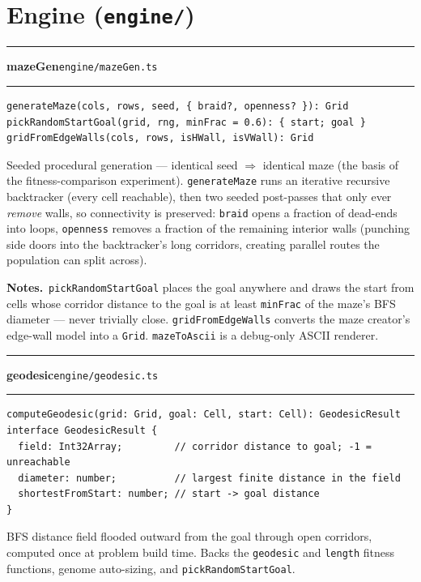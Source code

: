 \documentclass[11pt,a4paper]{report}
\newcommand{\srcfile}[1]{\texttt{\small #1}}   %
\newcommand{\ts}[1]{\texttt{#1}}               %
\newenvironment{apientry}[2]{%
  \par\medskip\noindent
  \begin{minipage}{\textwidth}
  \hrule\vspace{0.6ex}
  {\large\ttfamily\bfseries #1}\hfill{\footnotesize\srcfile{#2}}
  \vspace{0.4ex}\hrule\medskip
}{%
  \end{minipage}\par\medskip
}
\newcommand{\apifield}[1]{\par\smallskip\noindent\textbf{#1.}\ }
\begin{document}
\section{Engine (\srcfile{engine/})}

\begin{apientry}{mazeGen}{engine/mazeGen.ts}
\begin{lstlisting}
generateMaze(cols, rows, seed, { braid?, openness? }): Grid
pickRandomStartGoal(grid, rng, minFrac = 0.6): { start; goal }
gridFromEdgeWalls(cols, rows, isHWall, isVWall): Grid
\end{lstlisting}
Seeded procedural generation --- identical seed $\Rightarrow$ identical
maze (the basis of the fitness-comparison experiment). \ts{generateMaze}
runs an iterative recursive backtracker (every cell reachable), then two
seeded post-passes that only ever \emph{remove} walls, so connectivity is
preserved: \ts{braid} opens a fraction of dead-ends into loops,
\ts{openness} removes a fraction of the remaining interior walls
(punching side doors into the backtracker's long corridors, creating
parallel routes the population can split across).
\apifield{Notes}\ts{pickRandomStartGoal} places the goal anywhere and
draws the start from cells whose corridor distance to the goal is at
least \ts{minFrac} of the maze's BFS diameter --- never trivially close.
\ts{gridFromEdgeWalls} converts the maze creator's edge-wall model into a
\ts{Grid}. \ts{mazeToAscii} is a debug-only ASCII renderer.
\end{apientry}

\begin{apientry}{geodesic}{engine/geodesic.ts}
\begin{lstlisting}
computeGeodesic(grid: Grid, goal: Cell, start: Cell): GeodesicResult
interface GeodesicResult {
  field: Int32Array;         // corridor distance to goal; -1 = unreachable
  diameter: number;          // largest finite distance in the field
  shortestFromStart: number; // start -> goal distance
}
\end{lstlisting}
BFS distance field flooded outward from the goal through open corridors,
computed once at problem build time. Backs the \ts{geodesic} and
\ts{length} fitness functions, genome auto-sizing, and
\ts{pickRandomStartGoal}.
\end{apientry}
\end{document}
